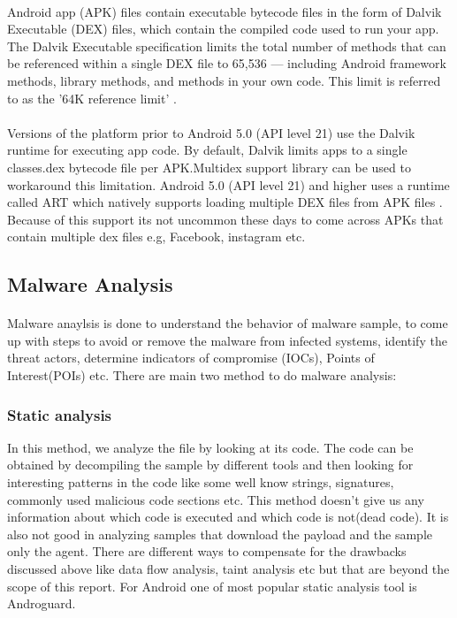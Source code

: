 \documentclass[../main.tex]{subfile}
\begin{document}
				\paragraph{}  Android app (APK) files contain executable bytecode files in the form of Dalvik Executable (DEX) files, which contain the compiled code used to run your app. The Dalvik Executable specification limits the total number of methods that can be referenced within a single DEX file to 65,536 — including Android framework methods, library methods, and methods in your own code. This limit is referred to as the '64K reference limit' . \cite{multidex}
				
				\paragraph{} Versions of the platform prior to Android 5.0 (API level 21) use the Dalvik runtime for executing app code. By default, Dalvik limits apps to a single classes.dex bytecode file per APK.Multidex support library can be used to workaround this limitation. Android 5.0 (API level 21) and higher uses a runtime called ART which natively supports loading multiple DEX files from APK files . Because of this support its not uncommon these days to come across APKs that contain multiple dex files e.g, Facebook, instagram etc. \cite{multidex}
		\subsection{Malware Analysis}\label{sec:malware_analysis}
		\paragraph{} Malware anaylsis is done to understand the behavior of malware sample, to come up with steps to avoid or remove the malware from infected systems, identify the threat actors, determine indicators of compromise (IOCs), Points of Interest(POIs) etc. There are main two method to do malware analysis:
		\subsubsection[Static Analysis]{Static analysis} In this method, we analyze the file by looking at its code. The code can be obtained by decompiling the sample by different tools and then looking for interesting patterns in the code like some well know strings, signatures, commonly used malicious code sections etc. This method doesn't give us any information about which code is executed and which code is not(dead code). It is also not good in analyzing samples that download the payload and the sample only the agent. There are different ways to compensate for the drawbacks discussed above like data flow analysis, taint analysis etc but that are beyond the scope of this report. For Android one of most popular static analysis tool is Androguard.
\end{document}
